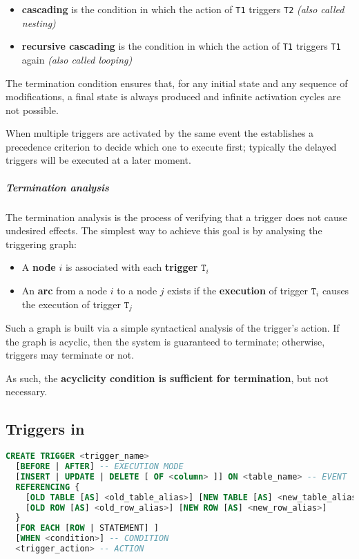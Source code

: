 \documentclass[english]{article}
\begin{document}
\begin{itemize}
  \item \textbf{cascading} is the condition in which the action of \texttt{T1} triggers \texttt{T2} \textit{(also called nesting)}
  \item \textbf{recursive cascading} is the condition in which the action of \texttt{T1} triggers \texttt{T1} again \textit{(also called looping)}
\end{itemize}

The termination condition ensures that, for any initial state and any sequence of modifications, a final state is always produced and infinite activation cycles are not possible.

\bigskip
When multiple triggers are activated by the same event the \dbms establishes a precedence criterion to decide which one to execute first;
typically the delayed triggers will be executed at a later moment.

\subparagraph*{Termination analysis}
The termination analysis is the process of verifying that a trigger does not cause undesired effects.
The simplest way to achieve this goal is by analysing the triggering graph:

\begin{itemize}
  \item A \textbf{node} \(i\) is associated with each \textbf{trigger} \(\texttt{T}_i\)
  \item An \textbf{arc} from a node \(i\) to a node \(j\) exists if the \textbf{execution} of trigger \(\texttt{T}_i\) causes the execution of trigger \(\texttt{T}_j\)
\end{itemize}

Such a graph is built via a simple syntactical analysis of the trigger's action.
If the graph is acyclic, then the system is guaranteed to terminate;
otherwise, triggers may terminate or not.

As such, the \textbf{acyclicity condition is sufficient for termination}, but not necessary.

\subsection{Triggers in \sql}

\begin{lstlisting}[language=SQL, caption={Trigger Syntax}, label={lst:trigger-syntax}]
CREATE TRIGGER <trigger_name>
  [BEFORE | AFTER] -- EXECUTION MODE
  [INSERT | UPDATE | DELETE [ OF <column> ]] ON <table_name> -- EVENT
  REFERENCING {
    [OLD TABLE [AS] <old_table_alias>] [NEW TABLE [AS] <new_table_alias>] |
    [OLD ROW [AS] <old_row_alias>] [NEW ROW [AS] <new_row_alias>]
  }
  [FOR EACH [ROW | STATEMENT] ]
  [WHEN <condition>] -- CONDITION
  <trigger_action> -- ACTION
\end{lstlisting}
\end{document}
